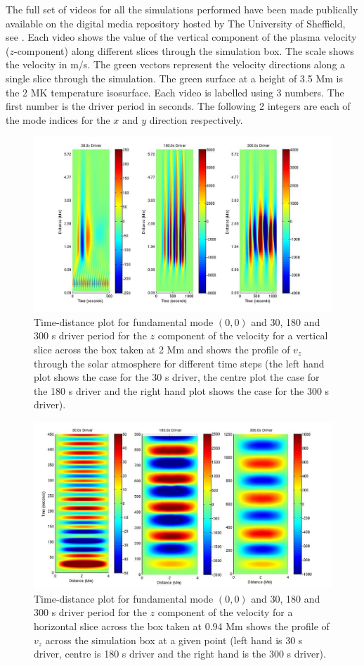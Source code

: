 \documentclass[preprint,authoryear,12pt]{elsarticle}
\begin{document}
The full set of videos for all the simulations performed have been made publically available on the digital media repository hosted by The University of Sheffield, see \citet{Griffiths2017}. Each video shows the value of the vertical component of the plasma velocity ($z$-component) along different slices through the simulation box. The scale shows the velocity in m/s. The green vectors represent the velocity directions along a single slice through the simulation. The green surface at a height of 3.5 Mm is the 2 MK temperature isosurface. 
Each video is labelled using 3 numbers. The first number is the driver period in seconds. The following 2 integers are each of the mode indices for the $x$ and $y$ direction respectively.
\begin{figure}[h]
\includegraphics[scale=0.4]{imrescale/fig2_dt_30_180_300_0_vert_2Mm.jpg}
\caption{Time-distance plot for fundamental mode $(0,0)$ and 30, 180 and 300 s driver period for the $z$ component of the velocity for a vertical slice across the box  taken at 2 Mm and shows  the profile of $v_{z}$ through the solar atmosphere for different time steps (the left hand plot shows the case for the 30 s driver, the centre plot the case for the 180 s driver and the right hand plot shows the case for the 300 s  driver). }
\label{Fig3}
\end{figure}
\begin{figure}[h]
\includegraphics[scale=0.4]{imrescale/fig3_dt_30_180_300_0_horiz_p94Mm.jpg}
\caption{Time-distance plot for fundamental mode $(0,0)$  and 30, 180 and 300 s driver period for the $z$ component of the velocity for a horizontal slice across the box  taken at 0.94 Mm shows  the profile of $ v_{z}$ across the simulation box at a given point (left hand is 30 s driver, centre is 180 s driver and the right hand is the 300 s driver). }
\label{Fig4}
\end{figure}
\end{document}

